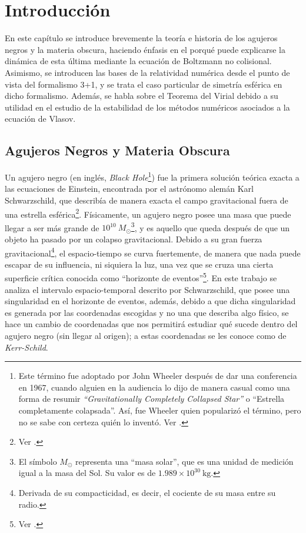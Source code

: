 \documentclass[11pt,twoside,openright,spanish]{report}
\numberwithin{equation}{chapter}
\numberwithin{figure}{chapter}
\numberwithin{table}{chapter}
\begin{document}
\chapter{Introducción}\label{cap:Introducción}
\noindent
En este capítulo se introduce brevemente la teoría e historia de los agujeros negros y la materia obscura, haciendo énfasis en el porqué puede explicarse la dinámica de esta última mediante la ecuación de Boltzmann no colisional. Asimismo, se introducen las bases de la relatividad numérica desde el punto de vista del formalismo 3+1, y se trata el caso particular de simetría esférica en dicho formalismo. Además, se habla sobre el Teorema del Virial debido a su utilidad en el estudio de la estabilidad de los métodos numéricos asociados a la ecuación de Vlasov.

\section{Agujeros Negros y Materia Obscura}
\noindent
Un agujero negro (en inglés, \textit{Black Hole}\footnote{Este término fue adoptado por John Wheeler después de dar una conferencia en 1967, cuando alguien en la audiencia lo dijo de manera casual como una forma de resumir \textit{``Gravitationally Completely Collapsed Star''} o ``Estrella completamente colapsada''. Así, fue Wheeler quien popularizó el término, pero no se sabe con certeza quién lo inventó. Ver \citet{quinionbh}.}) fue la primera solución teórica exacta a las ecuaciones de Einstein, encontrada por el astrónomo alemán Karl Schwarzschild, que describía de manera exacta el campo gravitacional fuera de una estrella esférica\footnote{Ver \citet{schutzgftgu}.}. Físicamente, un agujero negro posee una masa que puede llegar a ser más grande de $10^{10}\ M_{\odot}$\footnote{El símbolo $M_{\odot}$ representa una ``masa solar'', que es una unidad de medición igual a la masa del Sol. Su valor es de $1.989\times10^{30}\ \text{kg}$.}, y es aquello que queda después de que un objeto ha pasado por un colapso gravitacional. Debido a su gran fuerza gravitacional\footnote{Derivada de su compacticidad, es decir, el cociente de su masa entre su radio.}, el espacio-tiempo se curva fuertemente, de manera que nada puede escapar de su influencia, ni siquiera la luz, una vez que se cruza una cierta superficie crítica conocida como ``horizonte de eventos''\footnote{Ver \citet{ruffiniitbh}.}. En este trabajo se analiza el intervalo espacio-temporal descrito por Schwarzschild, que posee una singularidad en el horizonte de eventos, además, debido a que dicha singularidad es generada por las coordenadas escogidas y no una que describa algo físico, se hace un cambio de coordenadas que nos permitirá estudiar qué sucede dentro del agujero negro (sin llegar al origen); a estas coordenadas se les conoce como de \emph{Kerr-Schild}.
\end{document}
